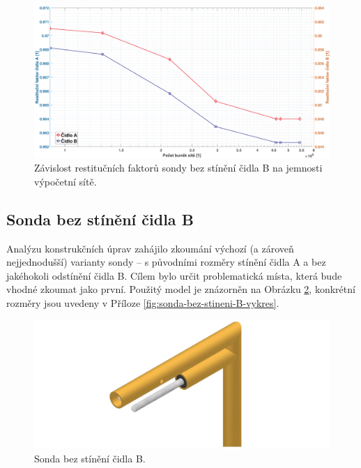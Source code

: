         \begin{figure}[ht!]
            \centering
            \includegraphics*[width=\textwidth]{400_SIMULACE_KONSTRUKCNICH_UPRAV/Grafy/citlivost_site.eps}
            \caption{Závislost restitučních faktorů sondy bez stínění čidla B na jemnosti výpočetní sítě.}
            \label{fig:citlivost-site}
        \end{figure}
    \newpage
    \subsection{Sonda bez stínění čidla B} \label{sec:sonda-bez-stineni-B}
        Analýzu konstrukčních úprav zahájilo zkoumání výchozí (a zároveň nejjednodušší) varianty sondy – s původními rozměry stínění čidla A a bez jakéhokoli odstínění čidla B. Cílem bylo určit problematická místa, která bude vhodné zkoumat jako první. Použitý model je znázorněn na Obrázku \ref{fig:sonda-bez-stineni-B}, konkrétní rozměry jsou uvedeny v Příloze \ref{fig:sonda-bez-stineni-B-vykres}. 

        \begin{figure}[ht!]
            \centering
            \includegraphics[width=\textwidth]{400_SIMULACE_KONSTRUKCNICH_UPRAV/Vykresy_rendery/Sonda_bez_stineni_B.png}
            \caption{Sonda bez stínění čidla B.}
            \label{fig:sonda-bez-stineni-B}
        \end{figure}
        

